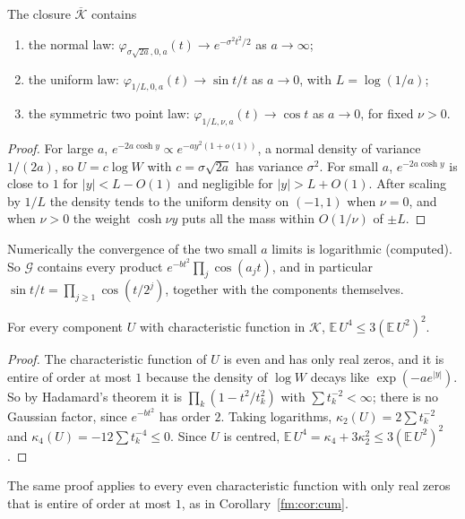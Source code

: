 \begin{proposition}\label{ap:prop:limits}
The closure $\overline{\mathcal K}$ contains
\begin{enumerate}
\item the normal law: $\varphi_{\sigma\sqrt{2a},0,a}(t)\to e^{-\sigma^2t^2/2}$ as $a\to\infty$;
\item the uniform law: $\varphi_{1/L,0,a}(t)\to\sin t/t$ as $a\to0$, with $L=\log(1/a)$;
\item the symmetric two point law: $\varphi_{1/L,\nu,a}(t)\to\cos t$ as $a\to0$, for fixed $\nu>0$.
\end{enumerate}
\end{proposition}

\begin{proof}
For large $a$, $e^{-2a\cosh y}\propto e^{-ay^2(1+o(1))}$, a normal density of variance $1/(2a)$, so $U=c\log W$ with $c=\sigma\sqrt{2a}$ has variance $\sigma^2$. For small $a$, $e^{-2a\cosh y}$ is close to $1$ for $|y|<L-O(1)$ and negligible for $|y|>L+O(1)$. After scaling by $1/L$ the density tends to the uniform density on $(-1,1)$ when $\nu=0$, and when $\nu>0$ the weight $\cosh\nu y$ puts all the mass within $O(1/\nu)$ of $\pm L$.
\end{proof}

Numerically the convergence of the two small $a$ limits is logarithmic (computed). So $\mathcal G$ contains every product $e^{-bt^2}\prod_j\cos(a_jt)$, and in particular $\sin t/t=\prod_{j\ge1}\cos(t/2^j)$, together with the components themselves.

\begin{lemma}\label{ap:lem:four}
For every component $U$ with characteristic function in $\mathcal K$, $\mathbb E\,U^4\le3(\mathbb E\,U^2)^2$.
\end{lemma}

\begin{proof}
The characteristic function of $U$ is even and has only real zeros, and it is entire of order at most $1$ because the density of $\log W$ decays like $\exp(-ae^{|y|})$. So by Hadamard's theorem it is $\prod_k(1-t^2/t_k^2)$ with $\sum t_k^{-2}<\infty$; there is no Gaussian factor, since $e^{-bt^2}$ has order $2$. Taking logarithms, $\kappa_2(U)=2\sum t_k^{-2}$ and $\kappa_4(U)=-12\sum t_k^{-4}\le0$. Since $U$ is centred, $\mathbb E\,U^4=\kappa_4+3\kappa_2^2\le3(\mathbb E\,U^2)^2$.
\end{proof}

The same proof applies to every even characteristic function with only real zeros that is entire of order at most $1$, as in Corollary~\ref{fm:cor:cum}.


